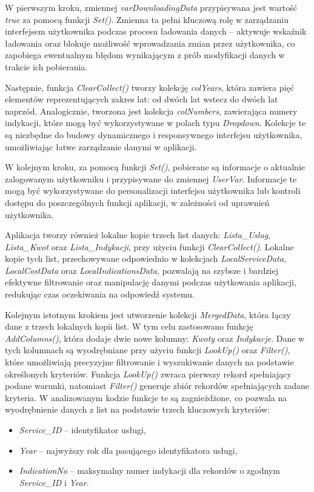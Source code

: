 W pierwszym kroku, zmiennej \emph{varDownloadingData} przypisywana jest wartość \emph{true} za pomocą funkcji \emph{Set()}. Zmienna ta pełni kluczową rolę w zarządzaniu interfejsem użytkownika podczas procesu ładowania danych – aktywuje wskaźnik ładowania oraz blokuje możliwość wprowadzania zmian przez użytkownika, co zapobiega ewentualnym błędom wynikającym z prób modyfikacji danych w trakcie ich pobierania.

Następnie, funkcja \emph{ClearCollect()} tworzy kolekcję \emph{colYears}, która zawiera pięć elementów reprezentujących zakres lat: od dwóch lat wstecz do dwóch lat naprzód. Analogicznie, tworzona jest kolekcja \emph{colNumbers}, zawierająca numery indykacji, które mogą być wykorzystywane w polach typu \emph{Dropdown}. Kolekcje te są niezbędne do budowy dynamicznego i responsywnego interfejsu użytkownika, umożliwiając łatwe zarządzanie danymi w aplikacji.

W kolejnym kroku, za pomocą funkcji \emph{Set()}, pobierane są informacje o aktualnie zalogowanym użytkowniku i przypisywane do zmiennej \emph{UserVar}. Informacje te mogą być wykorzystywane do personalizacji interfejsu użytkownika lub kontroli dostępu do poszczególnych funkcji aplikacji, w zależności od uprawnień użytkownika.

Aplikacja tworzy również lokalne kopie trzech list danych: \emph{Lista\_Uslug}, \emph{Lista\_Kwot} oraz \emph{Lista\_Indykacji}, przy użyciu funkcji \emph{ClearCollect()}. Lokalne kopie tych list, przechowywane odpowiednio w kolekcjach \emph{LocalServiceData}, \emph{LocalCostData} oraz \emph{LocalIndicationsData}, pozwalają na szybsze i bardziej efektywne filtrowanie oraz manipulację danymi podczas użytkowania aplikacji, redukując czas oczekiwania na odpowiedź systemu.

Kolejnym istotnym krokiem jest utworzenie kolekcji \emph{MergedData}, która łączy dane z trzech lokalnych kopii list. W tym celu zastosowano funkcję \emph{AddColumns()}, która dodaje dwie nowe kolumny: \emph{Kwoty} oraz \emph{Indykacje}. Dane w tych kolumnach są wyodrębniane przy użyciu funkcji \emph{LookUp()} oraz \emph{Filter()}, które umożliwiają precyzyjne filtrowanie i wyszukiwanie danych na podstawie określonych kryteriów. Funkcja \emph{LookUp()} zwraca pierwszy rekord spełniający podane warunki, natomiast \emph{Filter()} generuje zbiór rekordów spełniających zadane kryteria. W analizowanym kodzie funkcje te są zagnieżdżone, co pozwala na wyodrębnienie danych z list na podstawie trzech kluczowych kryteriów:
\begin{itemize}
\item \emph{Service\_ID} – identyfikator usługi,
\item \emph{Year} – najwyższy rok dla pasującego identyfikatora usługi,
\item \emph{IndicationNo} – maksymalny numer indykacji dla rekordów o zgodnym \emph{Service\_ID} i \emph{Year}.
\end{itemize}

